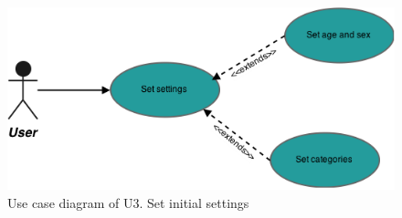 \begin{figure}[hp]
	\includegraphics[width=\textwidth]{fig/U3}
	\centering
	\caption{Use case diagram of U3. Set initial settings}
	\label{Fig:U3}
\end{figure}

